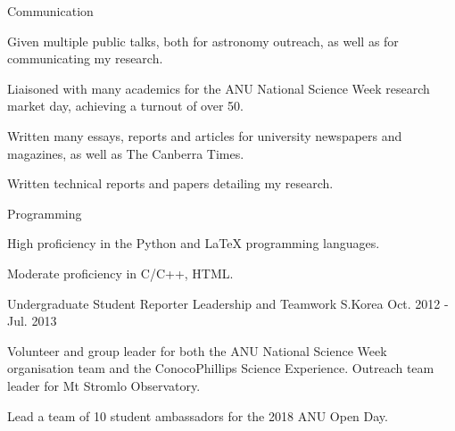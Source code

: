 

\begin{cventries}

  \cvskillentry
    {} %
    {Communication} %
    {} %
    {} %
    {
      \begin{cvitems} %
        \item {Given multiple public talks, both for astronomy outreach, as well as for communicating my research.}
        \item {Liaisoned with many academics for the ANU National Science Week research market day, achieving a turnout of over 50.}
        \item {Written many essays, reports and articles for university newspapers and magazines, as well as The Canberra Times.}
        \item {Written technical reports and papers detailing my research.}
      \end{cvitems}
    }

  \cvskillentry
    {} %
    {Programming} %
    {} %
    {} %
    {
      \begin{cvitems} %
        \item {High proficiency in the Python and LaTeX programming languages.}
        \item {Moderate proficiency in C/C++, HTML.}
      \end{cvitems}
    }
    
  \cvskillentry
    {Undergraduate Student Reporter} %
    {Leadership and Teamwork} %
    {S.Korea} %
    {Oct. 2012 - Jul. 2013} %
    {
      \begin{cvitems} %
        \item {Volunteer and group leader for both the ANU National Science Week organisation team and the ConocoPhillips Science Experience. Outreach team leader for Mt Stromlo Observatory.}
        \item {Lead a team of 10 student ambassadors for the 2018 ANU Open Day.}
      \end{cvitems}
    }

\end{cventries}

